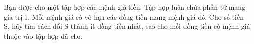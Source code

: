 Bạn được cho một tập hợp các mệnh giá tiền. Tập hợp luôn chứa phần tử mang gía trị 1. Mỗi mệnh giá có vô hạn các đồng tiền mang mệnh giá đó. Cho số tiền S, hãy tìm cách đổi S thành ít đồng tiền nhất, sao cho mỗi đồng tiền có mệnh giá thuộc vào tập hợp đã cho.  

\